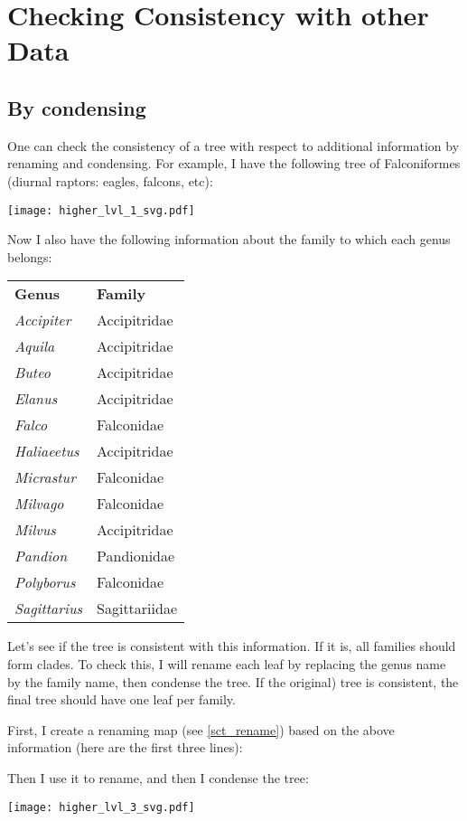 \section{Checking Consistency with other Data}
\label{sct_check_consistency}

\subsection{By condensing}

One can check the consistency of a tree with respect to additional information
by renaming and condensing. For example, I have the following tree of
Falconiformes (diurnal raptors: eagles, falcons, etc):

\texttt{[image: higher\_lvl\_1\_svg.pdf]}

\noindent{}Now I also have the following information about the family to which each genus belongs:

\bigskip{}
\begin{tabular}{ll}
\textbf{Genus} & \textbf{Family} \\
\textit{Accipiter} & Accipitridae \\
\textit{Aquila} & Accipitridae \\
\textit{Buteo} & Accipitridae \\
\textit{Elanus} & Accipitridae \\
\textit{Falco} & Falconidae \\
\textit{Haliaeetus} & Accipitridae \\
\textit{Micrastur} & Falconidae \\
\textit{Milvago} & Falconidae \\
\textit{Milvus} & Accipitridae \\
\textit{Pandion} & Pandionidae \\
\textit{Polyborus} & Falconidae \\
\textit{Sagittarius} & Sagittariidae
\end{tabular}
\bigskip{}

Let's see if the tree is consistent with this information. If it is, all
families should form clades. To check this, I will rename each leaf by
replacing the genus name by the family name, then condense the tree. If the
original) tree is consistent, the final tree should have one leaf per family.

First, I create a renaming map (see \ref{sct_rename}) based on the above
information (here are the first three lines):


Then I use it to rename, and then I condense the tree:

\texttt{[image: higher\_lvl\_3\_svg.pdf]}

